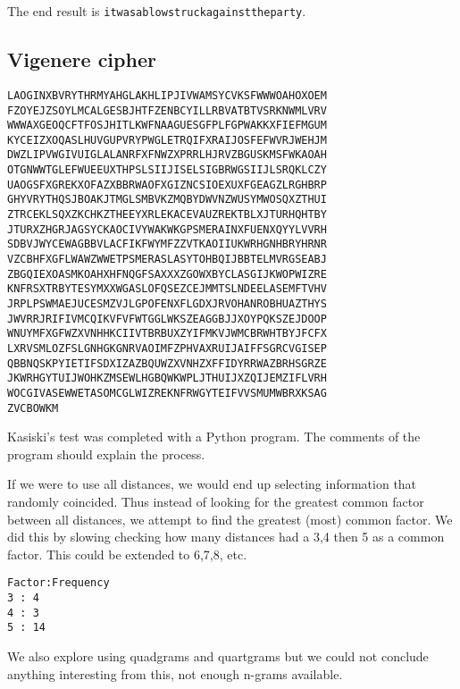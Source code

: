\documentclass{article}
\begin{document}
The end result is \texttt{itwasablowstruckagainsttheparty}.

\subsection{Vigenere cipher}
\begin{verbatim}
LAOGINXBVRYTHRMYAHGLAKHLIPJIVWAMSYCVKSFWWWOAHOXOEM
FZOYEJZSOYLMCALGESBJHTFZENBCYILLRBVATBTVSRKNWMLVRV
WWWAXGEOQCFTFOSJHITLKWFNAAGUESGFPLFGPWAKKXFIEFMGUM
KYCEIZXOQASLHUVGUPVRYPWGLETRQIFXRAIJOSFEFWVRJWEHJM
DWZLIPVWGIVUIGLALANRFXFNWZXPRRLHJRVZBGUSKMSFWKAOAH
OTGNWWTGLEFWUEEUXTHPSLSIIJISELSIGBRWGSIIJLSRQKLCZY
UAOGSFXGREKXOFAZXBBRWAOFXGIZNCSIOEXUXFGEAGZLRGHBRP
GHYVRYTHQSJBOAKJTMGLSMBVKZMQBYDWVNZWUSYMWOSQXZTHUI
ZTRCEKLSQXZKCHKZTHEEYXRLEKACEVAUZREKTBLXJTURHQHTBY
JTURXZHGRJAGSYCKAOCIVYWAKWKGPSMERAINXFUENXQYYLVVRH
SDBVJWYCEWAGBBVLACFIKFWYMFZZVTKAOIIUKWRHGNHBRYHRNR
VZCBHFXGFLWAWZWWETPSMERASLASYTOHBQIJBBTELMVRGSEABJ
ZBGQIEXOASMKOAHXHFNQGFSAXXXZGOWXBYCLASGIJKWOPWIZRE
KNFRSXTRBYTESYMXXWGASLOFQSEZCEJMMTSLNDEELASEMFTVHV
JRPLPSWMAEJUCESMZVJLGPOFENXFLGDXJRVOHANROBHUAZTHYS
JWVRRJRIFIVMCQIKVFVFWTGGLWKSZEAGGBJJXOYPQKSZEJDOOP
WNUYMFXGFWZXVNHHKCIIVTBRBUXZYIFMKVJWMCBRWHTBYJFCFX
LXRVSMLOZFSLGNHGKGNRVAOIMFZPHVAXRUIJAIFFSGRCVGISEP
QBBNQSKPYIETIFSDXIZAZBQUWZXVNHZXFFIDYRRWAZBRHSGRZE
JKWRHGYTUIJWOHKZMSEWLHGBQWKWPLJTHUIJXZQIJEMZIFLVRH
WOCGIVASEWWETASOMCGLWIZREKNFRWGYTEIFVVSMUMWBRXKSAG
ZVCBOWKM
\end{verbatim}

Kasiski's test was completed with a Python program. The comments of the program
should explain the process.


If we were to use all distances, we would end up selecting information that
randomly coincided. Thus instead of looking for the greatest common factor
between all distances, we attempt to find the greatest (most) common factor.
We did this by slowing checking how many distances had a 3,4 then
5 as a common factor. This could be extended to 6,7,8, etc.
\begin{verbatim}
Factor:Frequency
3 : 4
4 : 3
5 : 14
\end{verbatim}

We also explore using quadgrams and quartgrams but we could
not conclude anything interesting from this, not enough n-grams available.
\end{document}
